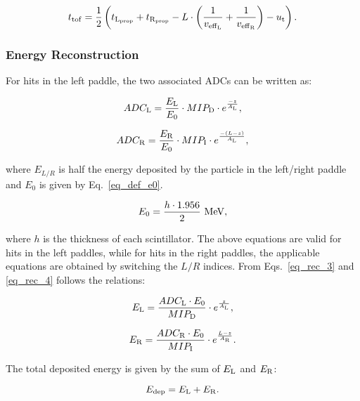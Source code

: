 \begin{equation}
t_{\rm{tof}}= \frac{1}{2}\left(t_{\rm{L}_{\rm{prop}}}+t_{\rm{R}_{\rm{prop}}}- L \cdot \left(\frac{1}{v_{\rm{eff}_{\rm{L}}}}
+\frac{1}{v_{\rm{eff}_{\rm{R}}}}\right)  -u_{\rm{t}}\right).
\end{equation}

\subsubsection{Energy Reconstruction}

For hits in the left paddle, the two associated ADCs can be written as:

\begin{equation}
\label{eq_rec_3}
ADC_{\rm{L}}=\frac{E_{\rm{L}}}{E_0}\cdot MIP_{\rm{D}}\cdot e^{\frac{-z}{A_{\rm{L}}}},
\end{equation}

\begin{equation}
\label{eq_rec_4}
ADC_{\rm{R}}=\frac{E_{\rm{R}}}{E_0}\cdot MIP_{\rm{I}}\cdot e^{\frac{-(L-z)}{A_{\rm{L}}}},
\end{equation}

\noindent
where $E_{L/R}$ is half the energy deposited by the particle in the left/right paddle and $E_0$ is given by
Eq.~\ref{eq_def_e0}.

\begin{equation}\label{eq_def_e0}
E_0=\frac{h\cdot 1.956}{2}~\rm{MeV},
\end{equation}

\noindent
where $h$ is the thickness of each scintillator. The above equations are valid for hits in the left paddles, while
for hits in the right paddles, the applicable equations are obtained by switching the $L/R$ indices. From
Eqs.~\ref{eq_rec_3} and \ref{eq_rec_4} follows the relations:

\begin{equation}
E_{\rm{L}}=\frac{ADC_{\rm{L}} \cdot E_0}{MIP_{\rm{D}}}\cdot e^{\frac{z}{A_{\rm{L}}}},
\end{equation}

\begin{equation}
E_{\rm{R}}=\frac{ADC_{\rm{R}} \cdot E_0}{MIP_{\rm{I}}}\cdot e^{\frac{L-z}{A_{\rm{R}}}}.
\end{equation}

\noindent
The total deposited energy is given by the sum of $E_{\rm{L}}$ and $E_{\rm{R}}$:

\begin{equation}
E_{\rm{dep}}=E_{\rm{L}}+E_{\rm{R}}.
\end{equation}

